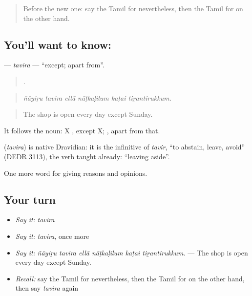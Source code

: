 \label{lesson:TA-C357-tavira}



\begin{quote}
Before the new one: say the Tamil for nevertheless, then the Tamil for on the other hand.
\end{quote}

\subsection*{You'll want to know: }
\textbf{} — \emph{tavira} — \textquotedblleft{}except; apart from\textquotedblright{}.

\begin{quote}
     .
\end{quote}

\begin{quote}
\emph{ñāyiṟu tavira ellā nāṭkaḷilum kaṭai tiṟantirukkum.}
\end{quote}

\begin{quote}
The shop is open every day except Sunday.
\end{quote}

It follows the noun: X , except X;  , apart from that.

\begin{cousinweb}
\textbf{} (\emph{tavira}) is native Dravidian: it is the infinitive of \emph{tavir}, \textquotedblleft{}to abstain, leave, avoid\textquotedblright{} (DEDR 3113), the verb  taught already: \textquotedblleft{}leaving aside\textquotedblright{}.
\end{cousinweb}

\begin{grammarlens}[title={What you've built}]
One more word for giving reasons and opinions.
\end{grammarlens}

\subsection*{Your turn}
\begin{itemize}
\raggedright
  \item \emph{Say it:} \emph{tavira}
  \item \emph{Say it:} \emph{tavira}, once more
  \item \emph{Say it:} \emph{ñāyiṟu tavira ellā nāṭkaḷilum kaṭai tiṟantirukkum.} — The shop is open every day except Sunday.
  \item \emph{Recall:} say the Tamil for nevertheless, then the Tamil for on the other hand, then say \emph{tavira} again
\end{itemize}

